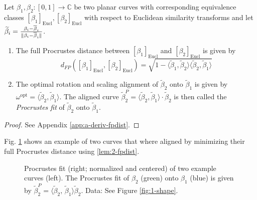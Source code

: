 \begin{lemma}
  \label{lem:2-fpdist}
  Let $\beta_1, \beta_2 : [0,1] \rightarrow \mathbb{C}$ be two planar curves with corresponding equivalence classes $[\beta_1]_\text{Eucl}, [\beta_2]_\text{Eucl}$ with respect to Euclidean similarity transforms and let $\widetilde\beta_i = \frac{\beta_i - \overline\beta_i}{\lVert\beta_i - \overline\beta_i\rVert}$.
  \begin{enumerate}[label=\emph{\roman*.)}]
    \item The full Procrustes distance between $[\beta_1]_\text{Eucl}$ and $[\beta_2]_\text{Eucl}$ is given by 
      \begin{equation}
        d_{FP}([\beta_1]_\text{Eucl},[\beta_2]_\text{Eucl}) = \sqrt{ 1 - \langle \widetilde\beta_1, \widetilde\beta_2 \rangle \langle \widetilde\beta_2, \widetilde\beta_1 \rangle }
      \end{equation}
    \item The optimal rotation and scaling alignment of $\widetilde\beta_2$ onto $\widetilde\beta_1$ is given by $\omega^\text{opt} = \langle \widetilde\beta_2, \widetilde\beta_1 \rangle$. 
      The aligned curve $\widetilde\beta_2^{P} = \langle \widetilde\beta_2, \widetilde\beta_1 \rangle \cdot \widetilde\beta_2$ is then called the \emph{Procrustes fit} of $\widetilde\beta_2$ onto $\widetilde\beta_1$.
  \end{enumerate}
  \begin{proof}
    See Appendix \ref{app:a-deriv-fpdist}.
  \end{proof}
\end{lemma}

\noindent Fig. \ref{fig:2-pfit} shows an example of two curves that where aligned by minimizing their full Procrustes distance using \ref{lem:2-fpdist}.

\begin{figure}
  \centering
  \begin{subfigure}{.48\textwidth}
    \centering
  \end{subfigure}\hfill%
  \begin{subfigure}{.48\textwidth}
    \centering
  \end{subfigure}
  \caption{
    Procrustes fit (right; normalized and centered) of two example curves (left).
    The Procrustes fit of $\beta_2$ (green) onto $\beta_1$ (blue) is given by $\widetilde\beta_2^P = \langle \widetilde\beta_2,\, \widetilde\beta_1 \rangle \widetilde\beta_2$.
    Data: See Figure \ref{fig:1-shape}.}
  \label{fig:2-pfit}
\end{figure}


